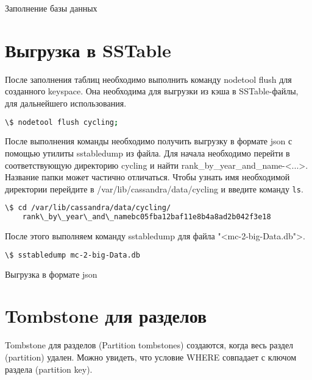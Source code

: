 \begin{image}
	\caption{Заполнение базы данных}
	\label{fig:cqlsh:create}
\end{image}

\section{Выгрузка в SSTable}

После заполнения таблиц необходимо выполнить команду nodetool
flush для созданного keyspace. Она необходима для выгрузки из кэша в
SSTable-файлы, для дальнейшего использования.

\begin{lstlisting}[language=bash]
\$ nodetool flush cycling;
\end{lstlisting}

После выполнения команды необходимо получить выгрузку в формате
json с помощью утилиты sstabledump из файла. Для начала необходимо перейти
в соответствующую директорию cycling и найти rank\_by\_year\_and\_name-<...>.
Название папки может частично отличаться.
Чтобы узнать имя необходимой директории перейдите
в /var/lib/cassandra/data/cycling и введите команду \texttt{ls}.

\begin{lstlisting}[language=bash]
\$ cd /var/lib/cassandra/data/cycling/
	rank\_by\_year\_and\_namebc05fba12baf11e8b4a8ad2b042f3e18
\end{lstlisting}

После этого выполняем команду sstabledump для файла "<mc-2-big-Data.db">.

\begin{lstlisting}[language=bash]
\$ sstabledump mc-2-big-Data.db
\end{lstlisting}

\begin{image}
	\caption{Выгрузка в формате json}
	\label{fig:sstabledump:json}
\end{image}

\section{Tombstone для разделов}

Tombstone для разделов (Partition tombstones) создаются, когда весь
раздел (partition) удален. Можно увидеть, что условие WHERE совпадает с
ключом раздела (partition key).

